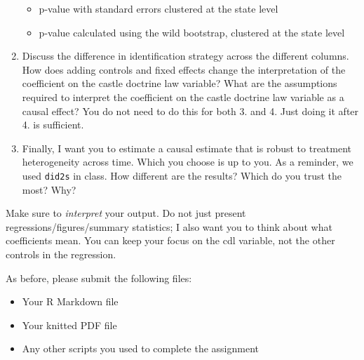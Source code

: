 \documentclass[
]{article}
\providecommand{\tightlist}{%
  \setlength{\itemsep}{0pt}\setlength{\parskip}{0pt}}
\begin{document}
\begin{enumerate}
  \begin{itemize}
  \tightlist
  \item
    p-value with standard errors clustered at the state level
  \item
    p-value calculated using the wild bootstrap, clustered at the state level
  \end{itemize}
\item
  Discuss the difference in identification strategy across the different columns. How does adding controls and fixed effects change the interpretation of the coefficient on the castle doctrine law variable? What are the assumptions required to interpret the coefficient on the castle doctrine law variable as a causal effect? You do not need to do this for both 3. and 4. Just doing it after 4. is sufficient.
\item
  Finally, I want you to estimate a causal estimate that is robust to treatment heterogeneity across time. Which you choose is up to you. As a reminder, we used \texttt{did2s} in class. How different are the results? Which do you trust the most? Why?
\end{enumerate}

Make sure to \emph{interpret} your output. Do not just present regressions/figures/summary statistics; I also want you to think about what coefficients mean. You can keep your focus on the cdl variable, not the other controls in the regression.

As before, please submit the following files:

\begin{itemize}
\tightlist
\item
  Your R Markdown file
\item
  Your knitted PDF file
\item
  Any other scripts you used to complete the assignment
\end{itemize}
\end{document}
